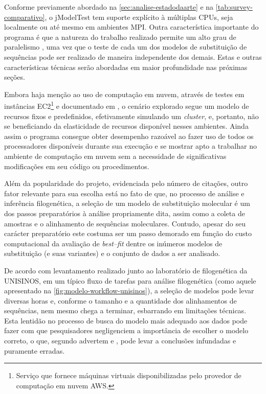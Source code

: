 \documentclass[english,brazilian]{UNISINOSmonografia} %
\begin{document}
Conforme previamente abordado na \autoref{sec:analise-estadodaarte} e na \autoref{tab:survey-comparativo}, o jModelTest tem suporte explícito à múltiplas CPUs, seja localmente ou até mesmo em ambientes MPI.
Outra característica importante do programa é que a natureza do trabalho realizado permite um alto grau de paralelismo \cite{Keane2006a}, uma vez que o teste de cada um dos modelos de substituição de sequências pode ser realizado de maneira independente dos demais.
Estas e outras características técnicas serão abordadas em maior profundidade nas próximas seções.


Embora haja menção ao uso de computação em nuvem, através de testes em instâncias 
EC2\footnote{
	Serviço que fornece máquinas virtuais disponibilizadas pelo provedor de computação em nuvem AWS.
} 
e documentado em , o cenário explorado segue um modelo de recursos fixos e predefinidos, efetivamente simulando um \textit{cluster}, e, portanto, não se beneficiando da elasticidade de recursos disponível nesses ambientes.
Ainda assim o programa consegue obter desempenho razoável ao fazer uso de todos os processadores disponíveis durante sua execução e se mostrar apto a trabalhar no ambiente de computação em nuvem sem a necessidade de significativas modificações em seu código ou procedimentos.


Além da popularidade do projeto, evidenciada pelo número de citações, outro fator relevante para sua escolha está no fato de que, no processo de análise e inferência filogenética, a seleção de um modelo de substituição molecular é um dos passos preparatórios à análise propriamente dita, assim como a coleta de amostras e o alinhamento de sequências moleculares.
Contudo, apesar do seu carácter preparatório este costuma ser um passo demorado em função do custo computacional da avaliação de \textit{best--fit} dentre os inúmeros modelos de substituição (e suas variantes) e o conjunto de dados a ser analisado.


De acordo com levantamento realizado junto ao laboratório de filogenética da UNISINOS, em um típico fluxo de tarefas para análise filogenética (como aquele apresentado na \autoref{fig:modelo-workflow-unisinos}), a seleção de modelos pode levar diversas horas e, conforme o tamanho e a quantidade dos alinhamentos de sequências, nem mesmo chega a terminar, esbarrando em limitações técnicas.
Esta lentidão no processo de busca do modelo mais adequado aos dados pode fazer com que pesquisadores negligenciem a importância de escolher o modelo correto, o que, segundo advertem  e , pode levar a conclusões infundadas e puramente erradas.
\end{document}
